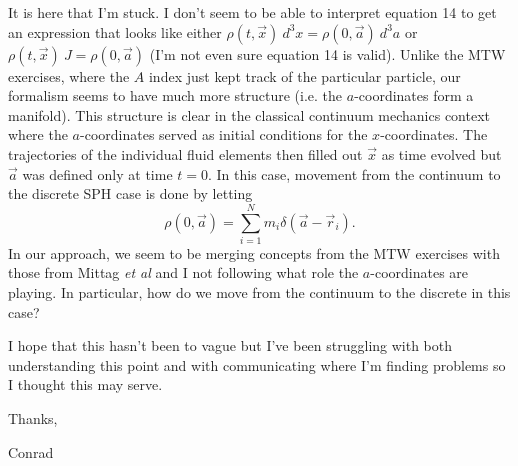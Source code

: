 \documentclass{article}
\begin{document}
It is here that I'm stuck.  I don't seem to be able to interpret equation 14 to get an expression that looks like either $\rho(t,{\vec x}) \ d^3x = \rho(0,{\vec a}) \ d^3a$ or $\rho(t,{\vec x}) \ J = \rho(0,{\vec a})$ (I'm not even sure equation 14 is valid).  Unlike the MTW exercises, where the $A$ index just kept track of the particular particle, our formalism seems to have much more structure (i.e. the $a$-coordinates form a manifold).  This structure is clear in the classical continuum mechanics context where the $a$-coordinates served as initial conditions for the $x$-coordinates.  The trajectories of the individual fluid elements then filled out $\vec x$ as time evolved but $\vec a$ was defined only at time $t=0$.  In this case, movement from the continuum to the discrete SPH case is done by letting 
\begin{equation}
\rho(0,{\vec a}) = \sum_{i=1}^{N} m_{i} \delta({\vec a} - {\vec r}_{i}).
\end{equation}
In our approach, we seem to be merging concepts from the MTW exercises with those from Mittag \emph{et al} and I not following what role the $a$-coordinates are playing.  In particular, how do we move from the continuum to the discrete in this case?

I hope that this hasn't been to vague but I've been struggling with both understanding this point and with communicating where I'm finding problems so I thought this may serve.
\


Thanks,

Conrad
\end{document}
